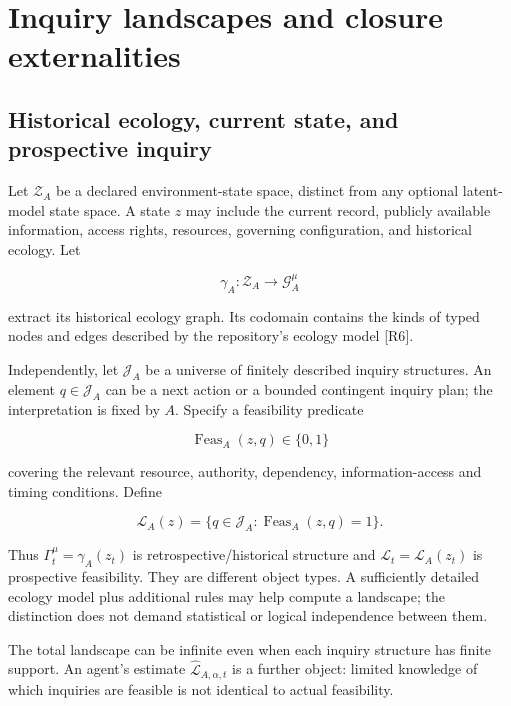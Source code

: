 \documentclass[11pt,a4paper]{article}
\begin{document}
\section{Inquiry landscapes and closure
externalities}\label{inquiry-landscapes-and-closure-externalities}

\subsection{Historical ecology, current state, and prospective
inquiry}\label{historical-ecology-current-state-and-prospective-inquiry}

Let \(\mathscr Z_A\) be a declared environment-state space, distinct
from any optional latent-model state space. A state \(z\) may include
the current record, publicly available information, access rights,
resources, governing configuration, and historical ecology. Let

\nopagebreak[4]

\[\gamma_A:\mathscr Z_A\to\mathscr G_A^\mu\]

extract its historical ecology graph. Its codomain contains the kinds of
typed nodes and edges described by the repository's ecology model
{[}R6{]}.

Independently, let \(\mathscr J_A\) be a universe of finitely described
inquiry structures. An element \(q\in\mathscr J_A\) can be a next action
or a bounded contingent inquiry plan; the interpretation is fixed by
\(A\). Specify a feasibility predicate

\nopagebreak[4]

\[\operatorname{Feas}_A(z,q)\in\{0,1\}\]

covering the relevant resource, authority, dependency,
information-access and timing conditions. Define

\nopagebreak[4]

\[
\boxed{\mathcal L_A(z)=\{q\in\mathscr J_A:\operatorname{Feas}_A(z,q)=1\}.}
\]

Thus \(\Gamma_t^\mu=\gamma_A(z_t)\) is retrospective/historical
structure and \(\mathcal L_t=\mathcal L_A(z_t)\) is prospective
feasibility. They are different object types. A sufficiently detailed
ecology model plus additional rules may help compute a landscape; the
distinction does not demand statistical or logical independence between
them.

The total landscape can be infinite even when each inquiry structure has
finite support. An agent's estimate
\(\widehat{\mathcal L}_{A,\alpha,t}\) is a further object: limited
knowledge of which inquiries are feasible is not identical to actual
feasibility.
\end{document}
